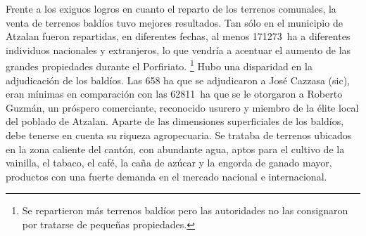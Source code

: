 \documentclass[14pt,twoside,final]{extbook} %
\let\oldfootnote\footnote
\renewcommand\footnote[1]{%
\oldfootnote{\hspace{1mm}#1}}
\begin{document}
Frente a los exiguos logros en cuanto el reparto de los terrenos comunales, la venta de terrenos baldíos tuvo mejores resultados. Tan sólo en el municipio de Atzalan fueron repartidas, en diferentes fechas, al menos 171273~ha a diferentes individuos nacionales y extranjeros, lo que vendría a acentuar el aumento de las grandes propiedades durante el Porfiriato.\footnote{Se repartieron más terrenos baldíos pero las autoridades no las consignaron por tratarse de pequeñas propiedades.} Hubo una disparidad en la adjudicación de los baldíos. Las 658 ha que se adjudicaron a José Cazzasa (sic), eran mínimas en comparación con las 62811~ha que se le otorgaron a Roberto Guzmán, un próspero comerciante, reconocido usurero y miembro de la élite local del poblado de Atzalan. Aparte de las dimensiones superficiales de los baldíos, debe tenerse en cuenta su riqueza agropecuaria. Se trataba de terrenos ubicados en la zona caliente del cantón, con abundante agua, aptos para el cultivo de la vainilla, el tabaco, el café, la caña de azúcar y la engorda de ganado mayor, productos con una fuerte demanda en el mercado nacional e internacional.
\end{document}
